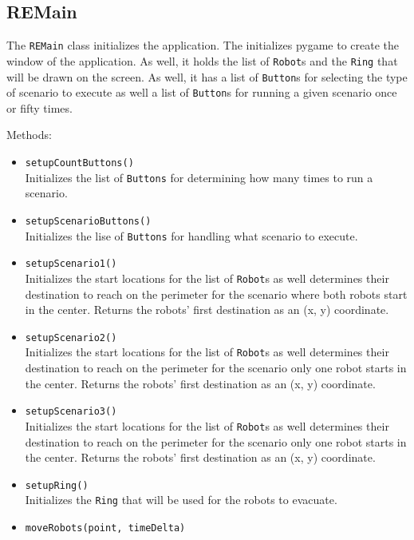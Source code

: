 \documentclass[12pt,letterpaper]{article}
\begin{document}
    \subsection{REMain}
        The \texttt{REMain} class initializes the application. The initializes pygame to create the window of the application. As well, it holds the list of \texttt{Robot}s and the \texttt{Ring} that will be drawn on the screen. As well, it has a list of \texttt{Button}s for selecting the type of scenario to execute as well a list of \texttt{Button}s for running a given scenario once or fifty times.

        \noindent Methods:
        \begin{itemize}
            \item \texttt{setupCountButtons()} \\
                Initializes the list of \texttt{Buttons} for determining how many times to run a scenario.
            \item \texttt{setupScenarioButtons()} \\
                Initializes the lise of \texttt{Buttons} for handling what scenario to execute.
            \item \texttt{setupScenario1()} \\
                Initializes the start locations for the list of \texttt{Robot}s as well determines their destination to reach on the perimeter for the scenario where both robots start in the center. Returns the robots' first destination as an (x, y) coordinate.
            \item \texttt{setupScenario2()} \\
                Initializes the start locations for the list of \texttt{Robot}s as well determines their destination to reach on the perimeter for the  scenario only one robot starts in the center. Returns the robots' first destination as an (x, y) coordinate.
            \item \texttt{setupScenario3()} \\
                Initializes the start locations for the list of \texttt{Robot}s as well determines their destination to reach on the perimeter for the  scenario only one robot starts in the center. Returns the robots' first destination as an (x, y) coordinate.
            \item \texttt{setupRing()} \\
                Initializes the \texttt{Ring} that will be used for the robots to evacuate.
            \item \texttt{moveRobots(point, timeDelta)} \\

\end{itemize}
\end{document}
